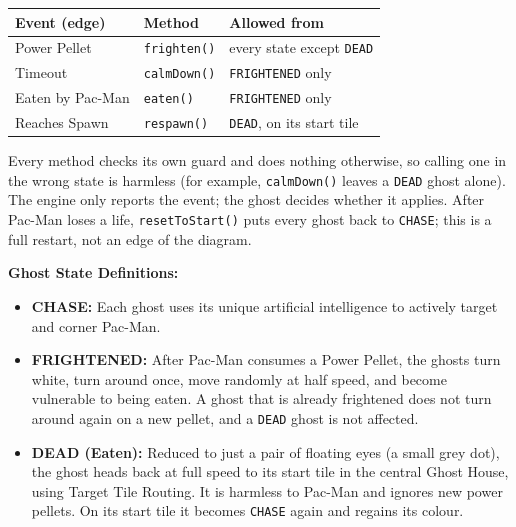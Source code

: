 \documentclass[11pt, a4paper]{article}
\begin{document}
\begin{itemize}
    \vspace{0.1cm}
    \begin{tabular}{@{}lll@{}}
        \toprule
        \textbf{Event (edge)} & \textbf{Method} & \textbf{Allowed from} \\
        \midrule
        Power Pellet & \texttt{frighten()} & every state except \texttt{DEAD} \\
        Timeout & \texttt{calmDown()} & \texttt{FRIGHTENED} only \\
        Eaten by Pac-Man & \texttt{eaten()} & \texttt{FRIGHTENED} only \\
        Reaches Spawn & \texttt{respawn()} & \texttt{DEAD}, on its start tile \\
        \bottomrule
    \end{tabular}
    \vspace{0.1cm}

    Every method checks its own guard and does nothing otherwise, so calling one in the wrong state is harmless (for example, \texttt{calmDown()} leaves a \texttt{DEAD} ghost alone). The engine only reports the event; the ghost decides whether it applies. After Pac-Man loses a life, \texttt{resetToStart()} puts every ghost back to \texttt{CHASE}; this is a full restart, not an edge of the diagram.
    
    \vspace{0.2cm}
    \textbf{Ghost State Definitions:}
    \begin{itemize}
        \item \textbf{CHASE:} Each ghost uses its unique artificial intelligence to actively target and corner Pac-Man.
        \item \textbf{FRIGHTENED:} After Pac-Man consumes a Power Pellet, the ghosts turn white, turn around once, move randomly at half speed, and become vulnerable to being eaten. A ghost that is already frightened does not turn around again on a new pellet, and a \texttt{DEAD} ghost is not affected.
        \item \textbf{DEAD (Eaten):} Reduced to just a pair of floating eyes (a small grey dot), the ghost heads back at full speed to its start tile in the central Ghost House, using Target Tile Routing. It is harmless to Pac-Man and ignores new power pellets. On its start tile it becomes \texttt{CHASE} again and regains its colour.
    \end{itemize}


\end{itemize}
\end{document}
